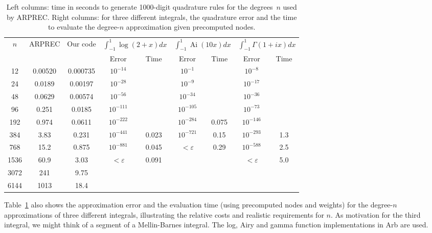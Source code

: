\documentclass[11pt,a4paper]{article}
\begin{document}
\begin{table}[h!]
\begin{centering}
\begin{tabular}{ c | c c | c c| c c | c c }
$n$ & ARPREC & Our code &
    \multicolumn{2}{|c|}{$\int_{-1}^{1}\!\log(2\!+\!x) dx$} &
    \multicolumn{2}{|c|}{$\int_{-1}^{1}\!\operatorname{Ai}(10 x) dx$} &
    \multicolumn{2}{|c}{$\int_{-1}^{1}\!\Gamma(1\!+\!ix) dx$} \\ 
   &         &          & Error   & Time      &  Error & Time  &  Error & Time \\ \hline
12 & 0.00520 & 0.000735 & $10^{-14}$ &       &   $10^{-1}$ &  &  $10^{-8}$ & \\
24 & 0.0189 & 0.00197 & $10^{-28}$  &       &  $10^{-9}$  & &  $10^{-17}$ & \\
48 & 0.0629 & 0.00574 & $10^{-56}$ &        &  $10^{-34}$  &    &  $10^{-36}$ & \\
96 & 0.251 & 0.0185 & $10^{-111}$  &         &  $10^{-105}$ &          &  $10^{-73}$ & \\
192 & 0.974 & 0.0611 & $10^{-222}$ &         &  $10^{-284}$ &    0.075      &   $10^{-146}$ & \\
384 & 3.83 & 0.231 & $10^{-441}$  &  0.023        & $10^{-721}$ & 0.15           &   $10^{-293}$ & 1.3 \\
768 & 15.2 & 0.875 & $10^{-881}$ & 0.045      & $<\varepsilon$ & 0.29           &   $10^{-588}$ & 2.5 \\
1536 & 60.9 & 3.03 & $<\varepsilon$ &  0.091     &                &    &            $<\varepsilon$ & 5.0 \\
3072 & 241 & 9.75 &  &  &  &  &  &  \\
6144 & 1013 & 18.4 &  &  &  &  &  &  \\
\end{tabular}
\caption{Left columns: time in seconds to generate 1000-digit
quadrature rules for the degrees~$n$ used by ARPREC.
Right columns: for three different integrals, the quadrature
error
and the time to evaluate the degree-$n$ approximation
given precomputed nodes.}
\label{tab:arprectimings}
\end{centering}
\end{table}

Table~\ref{tab:arprectimings} also
shows the approximation error
and the evaluation time (using precomputed nodes and weights)
for the degree-$n$ approximations of three different integrals,
illustrating the relative costs and realistic requirements for $n$.
As motivation for the third integral, we might think
of a segment of a Mellin-Barnes integral.
The log, Airy and gamma function implementations in Arb are used.
\end{document}
